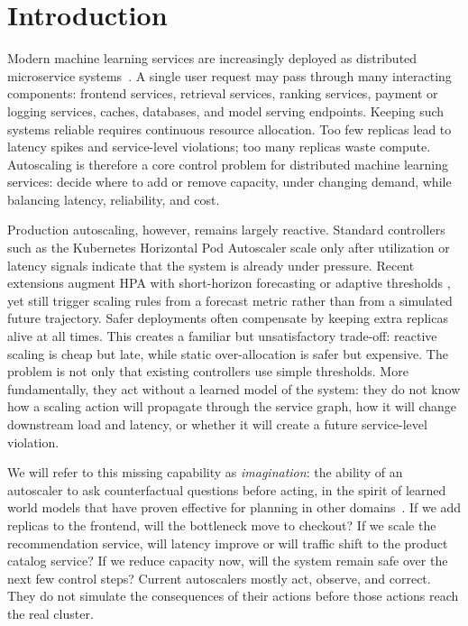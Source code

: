 \section{Introduction}
\label{sec:intro}

Modern machine learning services are increasingly deployed as distributed
microservice systems~\citep{qiu2020firm,alibabatrace2022}. A single user
request may pass through many interacting components: frontend services,
retrieval services, ranking services, payment or logging services,
caches, databases, and model serving endpoints. Keeping such systems
reliable requires continuous resource allocation. Too few replicas lead
to latency spikes and service-level violations; too many replicas waste
compute. Autoscaling is therefore a core control problem for distributed
machine learning services: decide where to add or remove capacity, under
changing demand, while balancing latency, reliability, and cost.

Production autoscaling, however, remains largely reactive. Standard
controllers such as the Kubernetes Horizontal Pod Autoscaler
\citep{rzadca2020autopilot,googlecloud2025hpa,aws2025hpa} scale only
after utilization or latency signals indicate that the system is already
under pressure. Recent extensions augment HPA with short-horizon
forecasting or adaptive thresholds
\citep{pozdniakova2024sla,mondal2023predictive,ahmad2024smarthpa,santos2024gwydion},
yet still trigger scaling rules from a forecast metric rather than from
a simulated future trajectory. Safer deployments often compensate by
keeping extra replicas alive at all times. This creates a familiar but unsatisfactory trade-off: reactive
scaling is cheap but late, while static over-allocation is safer but
expensive. The problem is not only that existing controllers use simple
thresholds. More fundamentally, they act without a learned model of
the system: they do not know how a scaling action will propagate
through the service graph, how it will change downstream load and
latency, or whether it will create a future service-level violation.

We will refer to this missing capability as \emph{imagination}: the
ability of an autoscaler to ask counterfactual questions before acting,
in the spirit of learned world models that have proven effective for
planning in other domains~\citep{ha2018worldmodels,hafner2025dreamerv3}.
If we add replicas to the frontend, will the bottleneck move to checkout? If we scale the
recommendation service, will latency improve or will traffic shift to
the product catalog service? If we reduce capacity now, will the system
remain safe over the next few control steps? Current autoscalers mostly
act, observe, and correct. They do not simulate the consequences of their
actions before those actions reach the real cluster.

